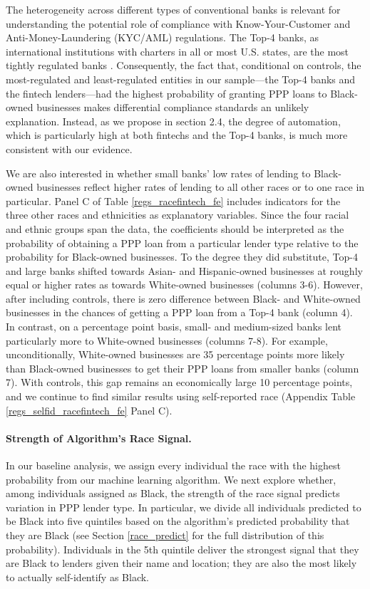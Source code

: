 \documentclass[11pt]{article}
\begin{document}
The heterogeneity across different types of conventional banks is relevant for understanding the potential role of compliance with Know-Your-Customer and Anti-Money-Laundering (KYC/AML) regulations. The Top-4 banks, as international institutions with charters in all or most U.S. states, are the most tightly regulated banks \citep{united2009too}. Consequently, the fact that, conditional on controls, the most-regulated and least-regulated entities in our sample---the Top-4 banks and the fintech lenders---had the highest probability of granting PPP loans to Black-owned businesses makes differential compliance standards an unlikely explanation. Instead, as we propose in section 2.4, the degree of automation, which is particularly high at both fintechs and the Top-4 banks, is much more consistent with our evidence. 

We are also interested in whether small banks' low rates of lending to Black-owned businesses reflect higher rates of lending to all other races or to one race in particular. Panel C of Table  \ref{regs_racefintech_fe} includes indicators for the three other races and ethnicities as explanatory variables. Since the four racial and ethnic groups span the data, the coefficients should be interpreted as the probability of obtaining a PPP loan from a particular lender type relative to the probability for Black-owned businesses. To the degree they did substitute, Top-4 and large banks shifted towards Asian- and Hispanic-owned businesses at roughly equal or higher rates as towards White-owned businesses (columns 3-6). However, after including controls, there is zero difference between Black- and White-owned businesses in the chances of getting a PPP loan from a Top-4 bank (column 4).  In contrast,  on a percentage point basis, small- and medium-sized banks lent particularly more to White-owned businesses  (columns 7-8). For example, unconditionally, White-owned businesses are 35 percentage points more likely than Black-owned businesses to get their PPP loans from smaller banks (column 7). With controls, this gap remains an economically large 10 percentage points, and we continue to find similar results using self-reported race (Appendix Table \ref{regs_selfid_racefintech_fe} Panel C).  

\paragraph*{Strength of Algorithm's Race Signal.}  

In our baseline analysis, we assign every individual the race with the highest probability from our machine learning algorithm. We next explore whether, among individuals assigned as Black, the strength of the race signal predicts variation in PPP lender type. In particular, we divide all individuals predicted to be Black into five quintiles based on the algorithm's predicted probability that they are Black (see Section \ref{race_predict} for the full distribution of this probability). Individuals in the 5th quintile deliver the strongest signal that they are Black to lenders given their name and location; they are also the most likely to actually self-identify as Black. 
\end{document}
